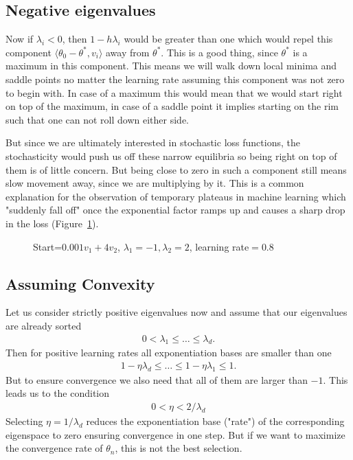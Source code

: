 \subsection{Negative eigenvalues}

Now if \(\lambda_i<0\), then \(1-h\lambda_i\) would be greater
than one which would repel this component \(\langle \theta_0 - \theta^*,
v_i\rangle\) away from \(\theta^*\). This is a good thing, since \(\theta^*\)
is a maximum in this component. This means we will walk down local minima and
saddle points no matter the learning rate assuming  this component  was not
zero to begin with. In case of a maximum this would mean that we would start
right on top of the maximum, in case of a saddle point it implies starting on
the rim such that one can not roll down either side.

But since we are ultimately interested in stochastic loss functions, the
stochasticity would push us off these narrow equilibria so being right on
top of them is of little concern. But being close to zero in such a component
still means slow movement away, since we are multiplying by it. This is a
common explanation for the observation of temporary plateaus in machine learning
which "suddenly fall off" once the exponential factor ramps up and causes a
sharp drop in the loss (Figure~\ref{fig: visualize saddlepoint gd}).
%
\begin{figure}[h]
	\centering
	\def\svgwidth{1\textwidth}
	
	\caption{Start=\(0.001v_1+4v_2\), \(\lambda_1=-1, \lambda_2=2\), learning rate\(=0.8\)}
	\label{fig: visualize saddlepoint gd}
\end{figure}

\subsection{Assuming Convexity}

Let us consider strictly positive eigenvalues now and assume that our
eigenvalues are already sorted
%
\begin{align}
	0 < \lambda_1 \le \dots \le \lambda_d.
\end{align}
%
Then for positive learning rates all exponentiation bases are smaller than one
%
\begin{align*}
	1-\eta\lambda_d \le \dots \le 1-\eta\lambda_1 \le 1.
\end{align*}
%
But to ensure convergence we also need that all of them are larger than \(-1\).
This leads us to the condition
\begin{align}\label{eq: learning rate restriction (eigenvalue)}
	0< \eta < 2/\lambda_d
\end{align}
%
Selecting \(\eta = 1/\lambda_d\) reduces the exponentiation base ("rate") of the
corresponding eigenspace to zero ensuring convergence in one step.
But if we want to maximize the convergence rate of \(\theta_n\), this is not
the best selection.

